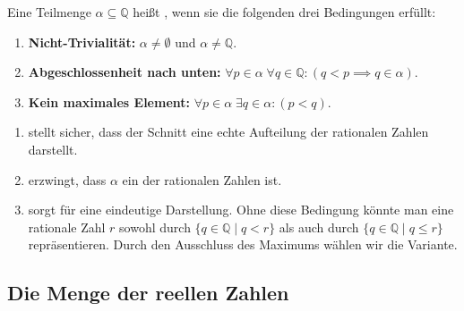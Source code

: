 \begin{math-stroke}
\begin{definition}\label{def:dedekind-schnitt}
Eine Teilmenge $\alpha \subseteq \mathbb{Q}$ heißt , wenn sie die folgenden drei Bedingungen erfüllt:
\begin{enumerate}[label=\textbf{(D\arabic*)}, start=0]
    \item \textbf{Nicht-Trivialität:} $\alpha \neq \emptyset$ und $\alpha \neq \mathbb{Q}$.
    \item \textbf{Abgeschlossenheit nach unten:} $\forall p \in \alpha \; \forall q \in \mathbb{Q} \colon (q < p \implies q \in \alpha)$.
    \item \textbf{Kein maximales Element:} $\forall p \in \alpha \; \exists q \in \alpha \colon (p < q)$.
\end{enumerate}
\end{definition}

\begin{explanation-of-steps}
\begin{enumerate}[label=\textbf{(D\arabic*)}, start=0]
    \item  stellt sicher, dass der Schnitt eine echte Aufteilung der rationalen Zahlen darstellt.
    \item  erzwingt, dass $\alpha$ ein  der rationalen Zahlen ist.
    \item  sorgt für eine eindeutige Darstellung. Ohne diese Bedingung könnte man eine rationale Zahl $r$ sowohl durch $\{q \in \mathbb{Q} \mid q < r\}$ als auch durch $\{q \in \mathbb{Q} \mid q \le r\}$ repräsentieren. Durch den Ausschluss des Maximums wählen wir die  Variante.
\end{enumerate}
\end{explanation-of-steps}
\end{math-stroke}

\subsection{Die Menge der reellen Zahlen}

